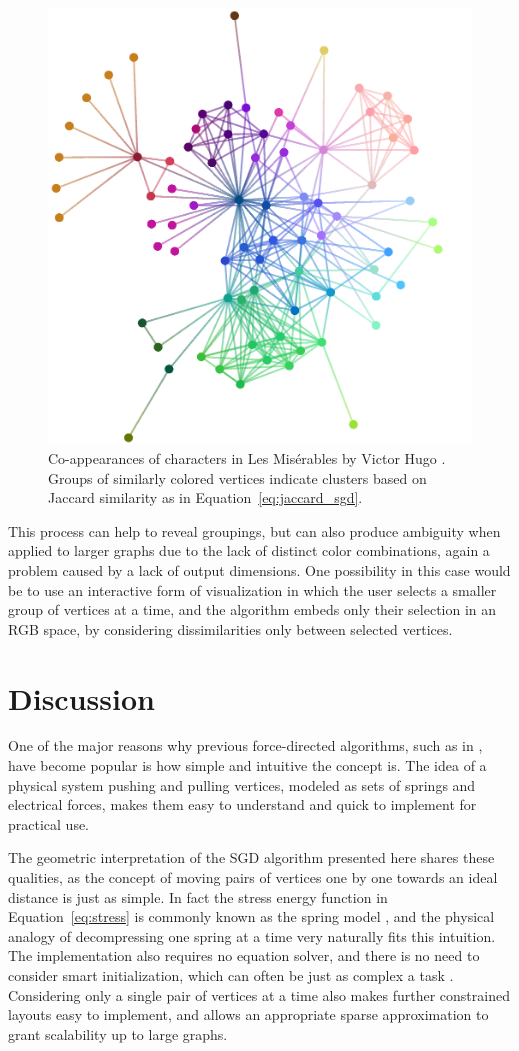 \begin{figure}
  \centering
  \includegraphics[width=.6\textwidth]{stress/lesmis.png}
  \caption[A graph \texttt{lesmis} with node colours embedded in RGB space]{
  Co-appearances of characters in Les Mis\'erables by Victor Hugo \cite{Knuth1993}.
  Groups of similarly colored vertices indicate clusters based on Jaccard similarity as in Equation~\eqref{eq:jaccard_sgd}.
  }
  \label{fig:jaccard}
\end{figure}

This process can help to reveal groupings, but can also produce ambiguity when applied to larger graphs due to the lack of distinct color combinations, again a problem caused by a lack of output dimensions. One possibility in this case would be to use an interactive form of visualization in which the user selects a smaller group of vertices at a time, and the algorithm embeds only their selection in an RGB space, by considering dissimilarities only between selected vertices.

\section{Discussion}
One of the major reasons why previous force-directed algorithms, such as in \cite{Fruchterman1991,Kamada1989,Dwyer2009},
have become popular is how simple and intuitive the concept is. The idea of a physical system pushing and pulling vertices, modeled as sets of springs and electrical forces, makes them easy to understand and quick to implement for practical use.

The geometric interpretation of the SGD algorithm presented
here shares these qualities, as the concept of moving pairs of vertices one by one towards an ideal distance is just as simple.
In fact the stress energy function in Equation~\eqref{eq:stress} is commonly known as the spring model \cite{Kamada1989,Hu2005}, and the physical analogy of decompressing one spring at a time very naturally fits this intuition.
The implementation also requires no equation solver, and there is no need to consider smart initialization, which can often be just as complex a task \cite{Brandes2008}.
Considering only a single pair of vertices at a time also makes further constrained layouts easy to implement, and allows an appropriate sparse approximation to grant scalability up to large graphs.

